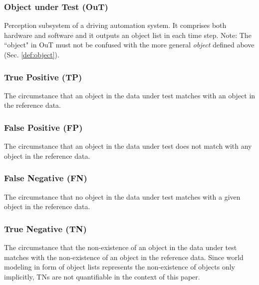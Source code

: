 \documentclass[conference]{IEEEtran}
\begin{document}
\subsubsection{Object under Test (OuT)} \label{def:out} Perception subsystem of a driving automation system. It comprises both hardware and software and it outputs an object list in each time step. Note: The ``object" in OuT must not be confused with the more general \textit{object} defined above (Sec. \ref{def:object}).

\subsubsection{True Positive (TP)} \label{def:tp} The circumstance that an object in the data under test matches with an object in the reference data.

\subsubsection{False Positive (FP)} \label{def:fp} The circumstance that an object in the data under test does not match with any object in the reference data. 

\subsubsection{False Negative (FN)} \label{def:fn} The circumstance that no object in the data under test matches with a given object in the reference data.

\subsubsection{True Negative (TN)} \label{def:tn} The circumstance that the non-existence of an object in the data under test matches with the non-existence of an object in the reference data. Since world modeling in form of object lists represents the non-existence of objects only implicitly, TNs are not quantifiable in the context of this paper.


\end{document}
